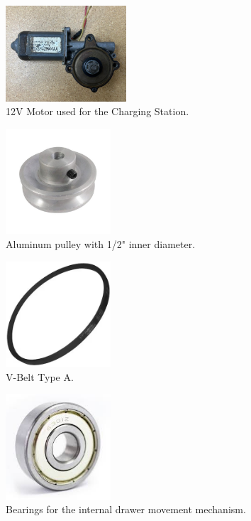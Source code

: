 
\begin{figure}[H]
    \centering
    \includegraphics[width=0.4\textwidth]{MECANISMO/MOTOR_12V.jpg}
    \caption{12V Motor used for the Charging Station.}
    \label{fig:motor}
\end{figure}

\begin{figure}[H]
    \centering
    \includegraphics[width=0.35\textwidth]{MECANISMO/POLEA_ALUMINIO.jpeg}
    \caption{Aluminum pulley with 1/2" inner diameter.}
    \label{fig:polea_aluminio}
\end{figure}

\begin{figure}[H]
    \centering
    \includegraphics[width=0.35\textwidth]{MECANISMO/BANDA_V_TIPOA-transformed.jpg}
    \caption{V-Belt Type A.}
    \label{fig:banda_v}
\end{figure}

\begin{figure}[H]
    \centering
    \includegraphics[width=0.35\textwidth]{MECANISMO/balero.jpeg}
    \caption{Bearings for the internal drawer movement mechanism.}
    \label{fig:balero}
\end{figure}

